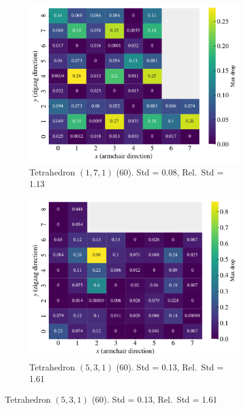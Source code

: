 \begin{figure}[H]
  \centering
  \begin{subfigure}[t]{0.49\textwidth}
      \centering
      \includegraphics[width=\textwidth]{figures/search/ref_search_drop_pop_1_7_1_ref_search.pdf}
      \caption{Tetrahedron $(1,7,1)$ (60). Std = 0.08, Rel.\ Std = 1.13}
  \end{subfigure}
  \hfill
  \begin{subfigure}[t]{0.49\textwidth}
    \centering
    \includegraphics[width=\textwidth]{figures/search/ref_search_drop_pop_5_3_1_ref_search.pdf}
    \caption{Tetrahedron $(5,3,1)$ (60). Std = 0.13, Rel.\ Std = 1.61}
  \end{subfigure}

\end{figure}
